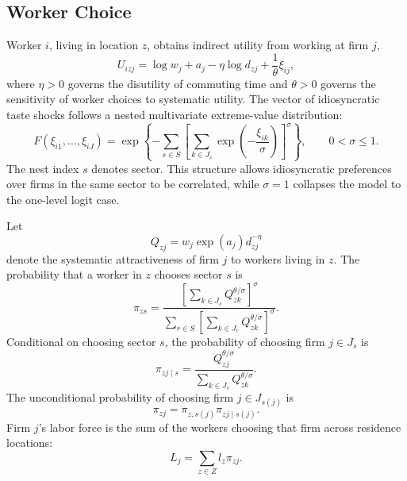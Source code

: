 \documentclass[12pt]{article}
\begin{document}
\subsection{Worker Choice}
Worker \(i\), living in location \(z\), obtains indirect utility from working at firm \(j\),
\begin{equation}
    U_{izj}
    =
    \log w_j
    +
    a_j
    -
    \eta\log d_{zj}
    +
    \frac{1}{\theta}\xi_{ij},
    \label{eq:model_utility}
\end{equation}
where \(\eta>0\) governs the disutility of commuting time and \(\theta>0\) governs the sensitivity of worker choices to systematic utility. The vector of idiosyncratic taste shocks follows a nested multivariate extreme-value distribution:
\begin{equation}
    F(\xi_{i1},\ldots,\xi_{iJ})
    =
    \exp\left\{
    -\sum_{s\in S}
    \left[
    \sum_{k\in J_s}
    \exp\left(-\frac{\xi_{ik}}{\sigma}\right)
    \right]^\sigma
    \right\},
    \qquad 0<\sigma\leq 1.
    \label{eq:model_nested_shocks}
\end{equation}
The nest index \(s\) denotes sector. This structure allows idiosyncratic preferences over firms in the same sector to be correlated, while \(\sigma=1\) collapses the model to the one-level logit case.

Let
\[
    Q_{zj}=w_j\exp(a_j)d_{zj}^{-\eta}
\]
denote the systematic attractiveness of firm \(j\) to workers living in \(z\). The probability that a worker in \(z\) chooses sector \(s\) is
\begin{equation}
    \pi_{zs}
    =
    \frac{
    \left[
    \sum_{k\in J_s} Q_{zk}^{\theta/\sigma}
    \right]^\sigma
    }{
    \sum_{r\in S}
    \left[
    \sum_{k\in J_r} Q_{zk}^{\theta/\sigma}
    \right]^\sigma
    }.
    \label{eq:model_sector_probability}
\end{equation}
Conditional on choosing sector \(s\), the probability of choosing firm \(j\in J_s\) is
\begin{equation}
    \pi_{zj\mid s}
    =
    \frac{
    Q_{zj}^{\theta/\sigma}
    }{
    \sum_{k\in J_s} Q_{zk}^{\theta/\sigma}
    }.
    \label{eq:model_within_sector_probability}
\end{equation}
The unconditional probability of choosing firm \(j\in J_{s(j)}\) is
\begin{equation}
    \pi_{zj}
    =
    \pi_{z,s(j)}\pi_{zj\mid s(j)}.
    \label{eq:model_choice_probability}
\end{equation}
Firm \(j\)'s labor force is the sum of the workers choosing that firm across residence locations:
\begin{equation}
    L_j
    =
    \sum_{z\in Z} l_z\pi_{zj}.
    \label{eq:model_labor}
\end{equation}
\end{document}
